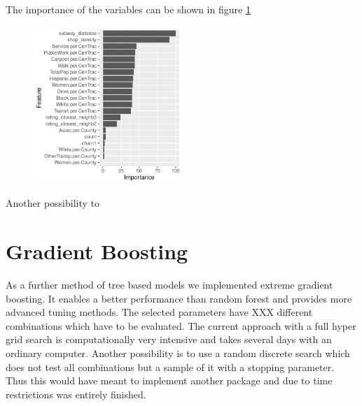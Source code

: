 \documentclass[11pt]{article}
\begin{document}
The importance of the variables can be shown in figure \ref{var_importance}

\begin{figure}[H]
\centering
{} \label{var_importance}

       \includegraphics[width=0.5\textwidth]{Plots/var_importance.pdf}
 

\end{figure}

Another possibility to 

\section{Gradient Boosting}

As a further method of tree based models we implemented extreme gradient boosting. It enables a better performance than random forest and provides more advanced tuning methods. The selected parameters have XXX different combinations which have to be evaluated. The current approach with a full hyper grid search is computationally very intensive and takes several days with an ordinary computer. Another possibility is to use a random discrete search which does not test all combinations but a sample of it with a stopping parameter. Thus this would have meant to implement another package and due to time restrictions was entirely finished.
\end{document}
